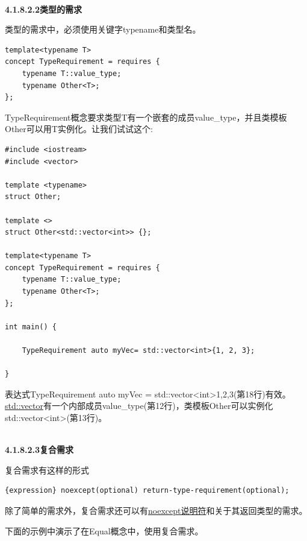 \hspace*{\fill} \\ %
\noindent
\textbf{4.1.8.2.2\hspace{0.2cm}类型的需求}

类型的需求中，必须使用关键字typename和类型名。

\begin{lstlisting}[style=styleCXX]
template<typename T>
concept TypeRequirement = requires {
	typename T::value_type;
	typename Other<T>;
};
\end{lstlisting}

TypeRequirement概念要求类型T有一个嵌套的成员value\_type，并且类模板Other可以用T实例化。让我们试试这个:

\begin{lstlisting}[style=styleCXX]
#include <iostream>
#include <vector>

template <typename>
struct Other;

template <>
struct Other<std::vector<int>> {};

template<typename T>
concept TypeRequirement = requires {
	typename T::value_type;
	typename Other<T>;
};

int main() {

	TypeRequirement auto myVec= std::vector<int>{1, 2, 3};

}
\end{lstlisting}

表达式TypeRequirement auto myVec = std::vector<int>{1,2,3}(第18行)有效。\href{https://en.cppreference.com/w/cpp/container/vector}{std::vector}有一个内部成员value\_type(第12行)，类模板Other可以实例化std::vector<int>(第13行)。

\hspace*{\fill} \\ %
\noindent
\textbf{4.1.8.2.3\hspace{0.2cm}复合需求}

复合需求有这样的形式

\begin{lstlisting}[style=styleCXX]
{expression} noexcept(optional) return-type-requirement(optional);
\end{lstlisting}

除了简单的需求外，复合需求还可以有\href{https://en.cppreference.com/w/cpp/language/noexcept_spec}{noexcept说明符}和关于其返回类型的需求。

下面的示例中演示了在Equal概念中，使用复合需求。

